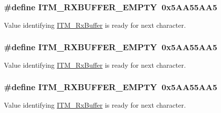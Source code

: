 \subsubsection[{\texorpdfstring{I\+T\+M\+\_\+\+R\+X\+B\+U\+F\+F\+E\+R\+\_\+\+E\+M\+P\+TY}{ITM_RXBUFFER_EMPTY}}]{\setlength{\rightskip}{0pt plus 5cm}\#define I\+T\+M\+\_\+\+R\+X\+B\+U\+F\+F\+E\+R\+\_\+\+E\+M\+P\+TY~0x5\+A\+A55\+A\+A5}\hypertarget{group__CMSIS__core__DebugFunctions_gaa822cb398ee022b59e9e6c5d7bbb228a}{}\label{group__CMSIS__core__DebugFunctions_gaa822cb398ee022b59e9e6c5d7bbb228a}
Value identifying \hyperlink{group__CMSIS__core__DebugFunctions_ga12e68e55a7badc271b948d6c7230b2a8}{I\+T\+M\+\_\+\+Rx\+Buffer} is ready for next character. 
\subsubsection[{\texorpdfstring{I\+T\+M\+\_\+\+R\+X\+B\+U\+F\+F\+E\+R\+\_\+\+E\+M\+P\+TY}{ITM_RXBUFFER_EMPTY}}]{\setlength{\rightskip}{0pt plus 5cm}\#define I\+T\+M\+\_\+\+R\+X\+B\+U\+F\+F\+E\+R\+\_\+\+E\+M\+P\+TY~0x5\+A\+A55\+A\+A5}\hypertarget{group__CMSIS__core__DebugFunctions_gaa822cb398ee022b59e9e6c5d7bbb228a}{}\label{group__CMSIS__core__DebugFunctions_gaa822cb398ee022b59e9e6c5d7bbb228a}
Value identifying \hyperlink{group__CMSIS__core__DebugFunctions_ga12e68e55a7badc271b948d6c7230b2a8}{I\+T\+M\+\_\+\+Rx\+Buffer} is ready for next character. 
\subsubsection[{\texorpdfstring{I\+T\+M\+\_\+\+R\+X\+B\+U\+F\+F\+E\+R\+\_\+\+E\+M\+P\+TY}{ITM_RXBUFFER_EMPTY}}]{\setlength{\rightskip}{0pt plus 5cm}\#define I\+T\+M\+\_\+\+R\+X\+B\+U\+F\+F\+E\+R\+\_\+\+E\+M\+P\+TY~0x5\+A\+A55\+A\+A5}\hypertarget{group__CMSIS__core__DebugFunctions_gaa822cb398ee022b59e9e6c5d7bbb228a}{}\label{group__CMSIS__core__DebugFunctions_gaa822cb398ee022b59e9e6c5d7bbb228a}
Value identifying \hyperlink{group__CMSIS__core__DebugFunctions_ga12e68e55a7badc271b948d6c7230b2a8}{I\+T\+M\+\_\+\+Rx\+Buffer} is ready for next character. 

